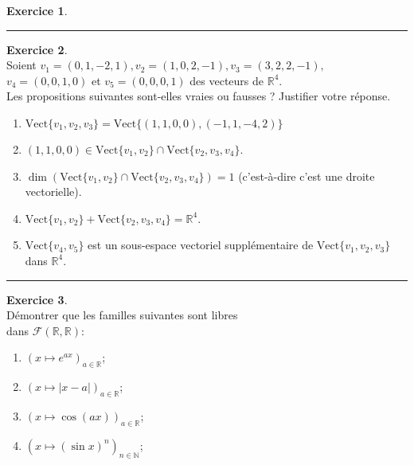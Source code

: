 \documentclass[a4paper,10pt]{article}
\theoremstyle{definition}
\theoremstyle{definition}
\newtheorem{exo}{Exercice}
\newcommand{\R}{\mathbb{R}}
\newcommand{\N}{\mathbb{N}}
\begin{document}
\begin{minipage}{1\linewidth}
\begin{minipage}[t]{0.48\linewidth}
\begin{exo}
		\centering
		\rule{1\linewidth}{0.6pt}
	\end{exo}
	
		\begin{exo}\quad\\
			Soient $v_1=(0,1,-2,1),
		v_2=(1,0,2,-1), v_3=(3,2,2,-1),$ $ v_4 = (0,0,1,0)$ et
		$v_5=(0,0,0,1)$ des vecteurs de $\R^4$.\\[0.25cm]  Les propositions
		suivantes sont-elles vraies ou fausses ?  Justifier votre r\'eponse.
		\begin{enumerate}
			\item$\text{Vect}\{ v_1, v_2, v_3 \}=\text{Vect}\{(1,1,0,0),(-1,1,-4,2)\}$
			\item $(1,1,0,0) \in \text{Vect}\{ v_1, v_2 \} \cap \text{Vect}\{ v_2, v_3, v_4 \}$.
			\item $\dim(\text{Vect}\{ v_1, v_2 \} \cap \text{Vect}\{ v_2, v_3, v_4 \})=1$ (c'est-à-dire c'est une droite vectorielle).
			\item $\text{Vect}\{ v_1, v_2 \} + \text{Vect}\{ v_2, v_3, v_4 \}= \R^4$.
			\item $\text{Vect}\{ v_4, v_5 \}$ est un sous-espace vectoriel 
			suppl\'ementaire de $\text{Vect}\{ v_1, v_2, v_3 \}$ dans $\R^4$.
		\end{enumerate}
		\centering
		\rule{1\linewidth}{0.6pt}
	\end{exo}

		\begin{exo}\quad\\
			Démontrer que les familles suivantes sont libres\\ dans $\mathcal{F}(\R,\R)$:\\[0.25cm]
			\begin{enumerate}
				\item $\left(x\longmapsto e^{ax}\right)_{a\in\R}$;\\[0.25cm]
				\item $\left(x\longmapsto |x-a|\right)_{a\in\R}$;\\[0.25cm]
				\item $\left(x\longmapsto \cos(ax)\right)_{a\in\R}$;\\[0.25cm]
				\item $\left(x\longmapsto (\sin x)^n\right)_{n\in\N}$;\\[0.25cm]
			\end{enumerate} 
		

\end{exo}
\end{minipage}
\end{minipage}
\end{document}
